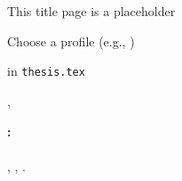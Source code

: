 \begin{titlepage}
	\thispagestyle{empty}

	\begin{center}
		{\huge\color{magenta}This title page is a placeholder}
		
		Choose a profile (e.g., \verb||) 
		
		in \verb|thesis.tex|
	\end{center}
	\vfill
	\begin{center}
		\thetitle
		
		\theforename{} \thesurname
	\end{center}
	\vfill
	\begin{center}
		\university, \school
	\end{center}
\end{titlepage}
\newpage
\thispagestyle{empty}
\vspace*{\fill}
\begin{minipage}{15.0cm}
	\textbf{\theforename{} \thesurname:}\\
	\emph{\thetitle\\}
	\thesiskind, \university, \theyear.
\end{minipage}